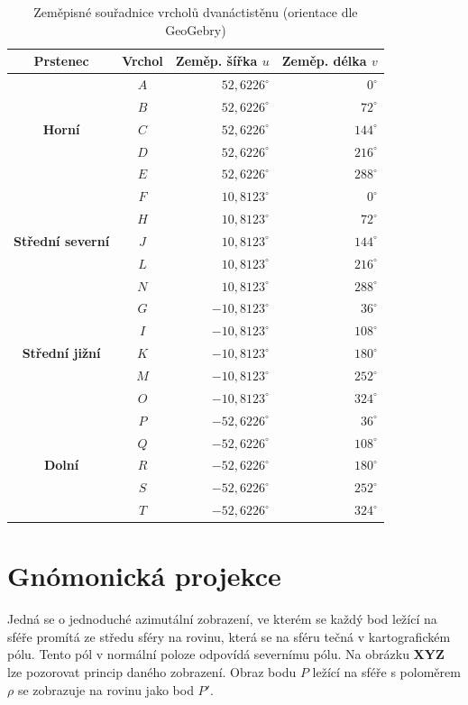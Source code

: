\documentclass[12pt, a4paper]{article}
\begin{document}
\begin{table}[H]
\centering
\caption{Zeměpisné souřadnice vrcholů dvanáctistěnu (orientace dle GeoGebry)}
\label{tab:souradnice_oprava}
\begin{tabular}{|c|c|r|r|}
\hline
\textbf{Prstenec} & \textbf{Vrchol} & \textbf{Zeměp. šířka $u$} & \textbf{Zeměp. délka $v$} \\ \hline
& $A$ & $52,6226^\circ$ & $0^\circ$ \\
& $B$ & $52,6226^\circ$ & $72^\circ$ \\
\textbf{Horní } & $C$ & $52,6226^\circ$ & $144^\circ$ \\
 & $D$ & $52,6226^\circ$ & $216^\circ$ \\
& $E$ & $52,6226^\circ$ & $288^\circ$ \\ \hline
& $F$ & $10,8123^\circ$ & $0^\circ$ \\
& $H$ & $10,8123^\circ$ & $72^\circ$ \\
\textbf{Střední severní} & $J$ & $10,8123^\circ$ & $144^\circ$ \\
& $L$ & $10,8123^\circ$ & $216^\circ$ \\
& $N$ & $10,8123^\circ$ & $288^\circ$ \\ \hline
& $G$ & $-10,8123^\circ$ & $36^\circ$ \\
& $I$ & $-10,8123^\circ$ & $108^\circ$ \\
\textbf{Střední jižní} & $K$ & $-10,8123^\circ$ & $180^\circ$ \\
& $M$ & $-10,8123^\circ$ & $252^\circ$ \\
& $O$ & $-10,8123^\circ$ & $324^\circ$ \\ \hline
& $P$ & $-52,6226^\circ$ & $36^\circ$ \\
& $Q$ & $-52,6226^\circ$ & $108^\circ$ \\
\textbf{Dolní} & $R$ & $-52,6226^\circ$ & $180^\circ$ \\
 & $S$ & $-52,6226^\circ$ & $252^\circ$ \\
& $T$ & $-52,6226^\circ$ & $324^\circ$ \\ \hline
\end{tabular}
\end{table}

\section{Gnómonická projekce}
Jedná se o jednoduché azimutální zobrazení, ve kterém se každý bod ležící na sféře promítá ze středu sféry na rovinu, která se na sféru tečná v kartografickém pólu. Tento pól v normální poloze odpovídá severnímu pólu. Na obrázku \textbf{XYZ} lze pozorovat princip daného zobrazení. Obraz bodu $P$ ležící na sféře s poloměrem $\rho$ se zobrazuje na rovinu jako bod $P'$. 
\end{document}
